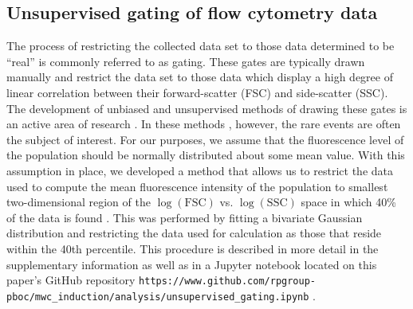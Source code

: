 \subsection*{Unsupervised gating of flow cytometry data}
The process of restricting the collected data set to those data determined to
be ``real'' is commonly referred to as gating. These gates are typically drawn
manually \cite{Maecker2005} and restrict the data set to those data  which
display a high degree of linear correlation  between their forward-scatter
(FSC) and side-scatter (SSC). The development of unbiased and unsupervised
methods of drawing these gates is an active area of research
\cite{Aghaeepour2013, Lo2008}. In these methods , however, the rare events are
often the subject of interest. For our purposes, we assume that the
fluorescence level of the population should be normally distributed about some
mean value. With this  assumption in place, we developed a method that allows
us to restrict the data used  to compute the mean fluorescence intensity of the
population to smallest two-dimensional  region of the $\log(\mathrm{FSC})$ vs.
$\log(\mathrm{SSC})$ space in which 40\% of the data is found . This  was
performed by fitting a bivariate Gaussian distribution and restricting the
data used for calculation as those that reside within the 40th percentile.
 This procedure is  described in
more detail in the supplementary information as well as in a  Jupyter notebook
located on this paper's GitHub repository
\texttt{https://www.github.com/rpgroup-pboc/mwc\_induction/analysis/unsupervised\_gating.ipynb} .

